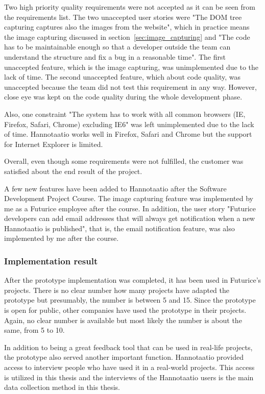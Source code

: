 \documentclass[english,12pt,a4paper,pdftex]{article}
\begin{document}
Two high priority quality requirements were not accepted as it can be seen from the requirements list. The two unaccepted user stories were "The DOM tree capturing captures also the images from the website", which in practice means the image capturing discussed in section~\ref{sec:image_capturing} and "The code has to be maintainable enough so that a developer outside the team can understand the structure and fix a bug in a reasonable time". The first unaccepted feature, which is the image capturing, was unimplemented due to the lack of time. The second unaccepted feature, which about code quality, was unaccepted because the team did not test this requirement in any way. However, close eye was kept on the code quality during the whole development phase.

Also, one constraint "The system has to work with all common browsers (IE, Firefox, Safari, Chrome) excluding IE6" was left unimplemented due to the lack of time. Hannotaatio works well in Firefox, Safari and Chrome but the support for Internet Explorer is limited.

Overall, even though some requirements were not fulfilled, the customer was satisfied about the end result of the project.

A few new features have been added to Hannotaatio after the Software Development Project Course. The image capturing feature was implemented by me as a Futurice employee after the course. In addition, the user story "Futurice developers can add email addresses that will always get notification when a new Hannotaatio is published", that is, the email notification feature, was also implemented by me after the course.

\subsubsection{Implementation result}

After the prototype implementation was completed, it has been used in Futurice's projects. There is no clear number how many projects have adapted the prototype but presumably, the number is between 5 and 15. Since the prototype is open for public, other companies have used the prototype in their projects. Again, no clear number is available but most likely the number is about the same, from 5 to 10.

In addition to being a great feedback tool that can be used in real-life projects, the prototype also served another important function. Hannotaatio provided access to interview people who have used it in a real-world projects. This access is utilized in this thesis and the interviews of the Hannotaatio users is the main data collection method in this thesis.
\end{document}
